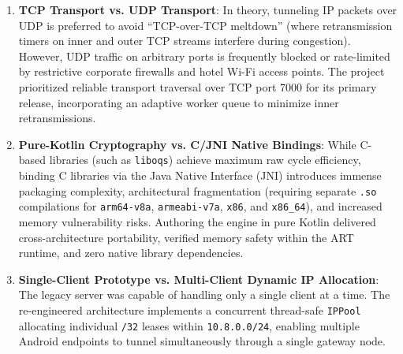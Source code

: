 \begin{enumerate}
    \item \textbf{TCP Transport vs. UDP Transport}: In theory, tunneling IP packets over UDP is preferred to avoid ``TCP-over-TCP meltdown'' (where retransmission timers on inner and outer TCP streams interfere during congestion). However, UDP traffic on arbitrary ports is frequently blocked or rate-limited by restrictive corporate firewalls and hotel Wi-Fi access points. The project prioritized reliable transport traversal over TCP port 7000 for its primary release, incorporating an adaptive worker queue to minimize inner retransmissions.
    \item \textbf{Pure-Kotlin Cryptography vs. C/JNI Native Bindings}: While C-based libraries (such as \texttt{liboqs}) achieve maximum raw cycle efficiency, binding C libraries via the Java Native Interface (JNI) introduces immense packaging complexity, architectural fragmentation (requiring separate \texttt{.so} compilations for \texttt{arm64-v8a}, \texttt{armeabi-v7a}, \texttt{x86}, and \texttt{x86\_64}), and increased memory vulnerability risks. Authoring the engine in pure Kotlin delivered cross-architecture portability, verified memory safety within the ART runtime, and zero native library dependencies.
    \item \textbf{Single-Client Prototype vs. Multi-Client Dynamic IP Allocation}: The legacy server was capable of handling only a single client at a time. The re-engineered architecture implements a concurrent thread-safe \texttt{IPPool} allocating individual \texttt{/32} leases within \texttt{10.8.0.0/24}, enabling multiple Android endpoints to tunnel simultaneously through a single gateway node.
\end{enumerate}
